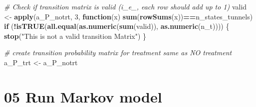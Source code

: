 \documentclass[
]{article}
\newenvironment{Shaded}{\begin{snugshade}}{\end{snugshade}}
\newcommand{\CommentTok}[1]{\textcolor[rgb]{0.56,0.35,0.01}{\textit{#1}}}
\newcommand{\ControlFlowTok}[1]{\textcolor[rgb]{0.13,0.29,0.53}{\textbf{#1}}}
\newcommand{\DecValTok}[1]{\textcolor[rgb]{0.00,0.00,0.81}{#1}}
\newcommand{\KeywordTok}[1]{\textcolor[rgb]{0.13,0.29,0.53}{\textbf{#1}}}
\newcommand{\NormalTok}[1]{#1}
\newcommand{\OperatorTok}[1]{\textcolor[rgb]{0.81,0.36,0.00}{\textbf{#1}}}
\newcommand{\StringTok}[1]{\textcolor[rgb]{0.31,0.60,0.02}{#1}}
\begin{document}
\begin{Shaded}
\begin{Highlighting}[]
\CommentTok{# Check if transition matrix is valid (i_e_, each row should add up to 1)}
\NormalTok{valid <-}\StringTok{ }\KeywordTok{apply}\NormalTok{(a_P_notrt, }\DecValTok{3}\NormalTok{, }\ControlFlowTok{function}\NormalTok{(x) }\KeywordTok{sum}\NormalTok{(}\KeywordTok{rowSums}\NormalTok{(x))}\OperatorTok{==}\NormalTok{n_states_tunnels)}
\ControlFlowTok{if}\NormalTok{ (}\OperatorTok{!}\KeywordTok{isTRUE}\NormalTok{(}\KeywordTok{all.equal}\NormalTok{(}\KeywordTok{as.numeric}\NormalTok{(}\KeywordTok{sum}\NormalTok{(valid)), }\KeywordTok{as.numeric}\NormalTok{(n_t)))) \{}
  \KeywordTok{stop}\NormalTok{(}\StringTok{"This is not a valid transition Matrix"}\NormalTok{)}
\NormalTok{\}}

\CommentTok{# create transition probability matrix for treatment same as NO treatment}
\NormalTok{a_P_trt <-}\StringTok{ }\NormalTok{a_P_notrt}
\end{Highlighting}
\end{Shaded}

\hypertarget{run-markov-model}{%
\section{05 Run Markov model}\label{run-markov-model}}

\begin{Shaded}
\end{Shaded}
\end{document}
